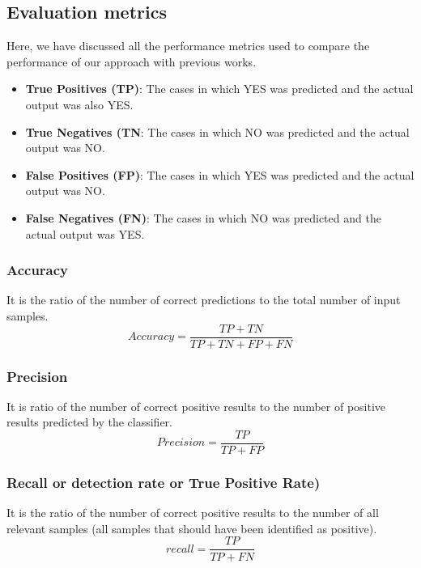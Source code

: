 \documentclass[14pt, conference]{IEEEtran}
\begin{document}
\subsection{Evaluation metrics}
Here, we have discussed all the performance metrics used to compare the performance of our approach with previous works.

\begin{itemize}
    \item \textbf{True Positives (TP)}: The cases in which YES was predicted and the actual output was also YES.
    \item \textbf{True Negatives (TN}: The cases in which NO was predicted and the actual output was NO.
    \item \textbf{False Positives (FP)}: The cases in which YES was predicted and the actual output was NO.
    \item \textbf{False Negatives (FN)}: The cases in which NO was predicted and the actual output was YES.
\end{itemize}

\subsubsection{Accuracy}
It is the ratio of the number of correct predictions to the total number of input samples.
\begin{equation}
    Accuracy = \frac{TP+TN}{TP+TN+FP+FN}
\end{equation}

\subsubsection{Precision}
It is ratio of the number of correct positive results to the number of positive results predicted by the classifier.
\begin{equation}
    Precision = \frac{TP}{TP+FP}
\end{equation}

\subsubsection{Recall or detection rate or True Positive Rate)}
It is the ratio of the number of correct positive results to the number of all relevant samples (all samples that should
have been identified as positive).
\begin{equation}
    recall = \frac{TP}{TP+FN}
\end{equation}
\end{document}
